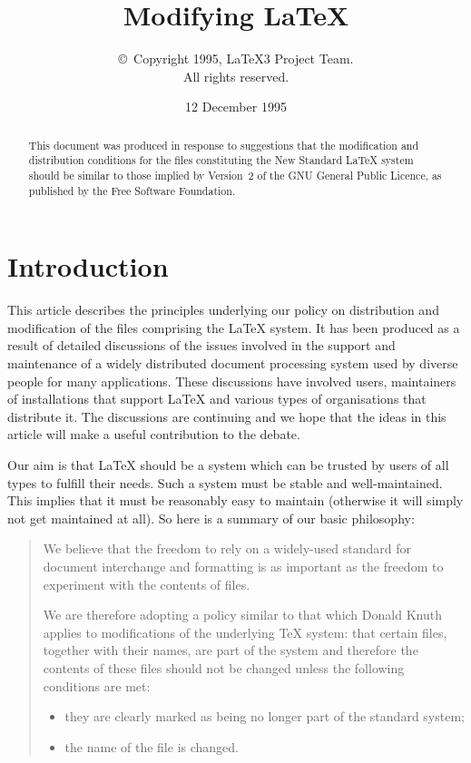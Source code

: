 \documentclass{ltxguide}[1995/11/28]
\title{Modifying \LaTeX}
\author{\copyright~Copyright 1995, \LaTeX3 Project Team.\\
   All rights reserved.}
\date{12 December 1995}
\begin{document}
 
\maketitle
 
\tableofcontents

\begin{abstract}
  This document was produced in response to suggestions that the
  modification and distribution conditions for the files constituting
  the New Standard \LaTeX{} system should be similar to those implied
  by Version~2 of the \textsc{GNU} General Public Licence, as
  published by the Free Software Foundation.
\end{abstract}

\section{Introduction}
\label{sec:intro}

This article describes the principles underlying our policy on
distribution and modification of the files comprising the \LaTeX{}
system.  It has been produced as a result of detailed discussions of
the issues involved in the support and maintenance of a widely
distributed document processing system used by diverse people for many
applications.  These discussions have involved users, maintainers of
installations that support \LaTeX{} and various types of organisations
that distribute it.  The discussions are continuing and we hope that
the ideas in this article will make a useful contribution to the
debate.

Our aim is that \LaTeX{} should be a system which can be trusted by
users of all types to fulfill their needs.  Such a system must be
stable and well-maintained.  This implies that it must be reasonably
easy to maintain (otherwise it will simply not get maintained at
all).  So here is a summary of our basic philosophy:
\begin{quote}
  We believe that the freedom to rely on a widely-used standard for
  document interchange and formatting is as important as the freedom to
  experiment with the contents of files.

  We are therefore adopting a policy similar to that which Donald
  Knuth applies to modifications of the underlying \TeX{} system: that
  certain files, together with their names, are part of the system and
  therefore the contents of these files should not be changed unless
  the following conditions are met:
  \begin{itemize}
  \item they are clearly marked as being no longer part of the
    standard system;
  \item the name of the file is changed.
  \end{itemize}
\end{quote}
\end{document}
